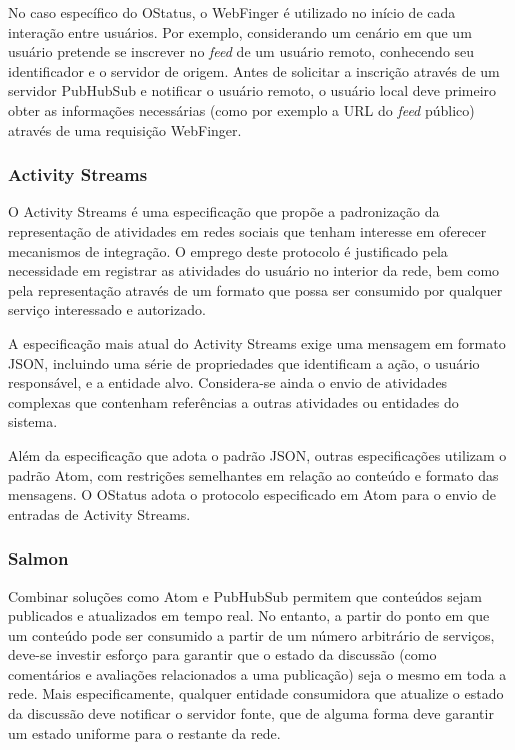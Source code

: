 
No caso específico do OStatus, o WebFinger é utilizado no início de cada interação
entre usuários. Por exemplo, considerando um cenário em que um usuário pretende se
inscrever no \textit{feed} de um usuário remoto, conhecendo seu identificador e o
servidor de origem. Antes de solicitar a inscrição através de um servidor PubHubSub e
notificar o usuário remoto, o usuário local deve primeiro obter as informações
necessárias (como por exemplo a URL do \textit{feed} público) através de uma
requisição  WebFinger.

\subsubsection{Activity Streams}


O Activity Streams é uma especificação que propõe a padronização da representação de
atividades em redes sociais que tenham interesse em oferecer mecanismos de
integração. O emprego deste protocolo é justificado pela necessidade em registrar as
atividades do usuário no interior da rede, bem como pela representação através de um
formato que possa ser consumido por qualquer serviço interessado e autorizado.

A especificação mais atual do Activity Streams exige uma mensagem em formato JSON,
incluindo uma série de propriedades que identificam a ação, o usuário responsável, e
a entidade alvo. Considera-se ainda o envio de atividades complexas que contenham
referências a outras atividades ou entidades do sistema. 

Além da especificação que adota o padrão JSON, outras especificações utilizam o
padrão Atom, com restrições semelhantes em relação ao conteúdo e formato das
mensagens. O OStatus adota o protocolo especificado em Atom para o envio de entradas
de Activity Streams.

\subsubsection{Salmon}

Combinar soluções como Atom e PubHubSub permitem que conteúdos sejam publicados e
atualizados em tempo real. No entanto, a partir do ponto em que um conteúdo pode ser
consumido a partir de um número arbitrário de serviços, deve-se investir esforço para
garantir que o estado da discussão (como comentários e avaliações relacionados a uma
publicação) seja o mesmo em toda a rede. Mais especificamente, qualquer entidade
consumidora que atualize o estado da discussão deve notificar o servidor fonte, que
de alguma forma deve garantir um estado uniforme para o restante da rede.

